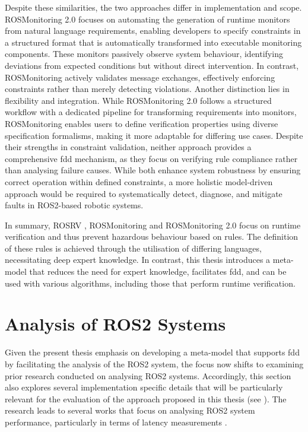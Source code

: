Despite these similarities, the two approaches differ in implementation and scope. ROSMonitoring 2.0 focuses on automating the generation of runtime monitors from natural language requirements, enabling developers to specify constraints in a structured format that is automatically transformed into executable monitoring components. These monitors passively observe system behaviour, identifying deviations from expected conditions but without direct intervention. In contrast, ROSMonitoring actively validates message exchanges, effectively enforcing constraints rather than merely detecting violations.
Another distinction lies in flexibility and integration. While ROSMonitoring 2.0 follows a structured workflow with a dedicated pipeline for transforming requirements into monitors, ROSMonitoring enables users to define verification properties using diverse specification formalisms, making it more adaptable for differing use cases.
Despite their strengths in constraint validation, neither approach provides a comprehensive \acl{fdd} mechanism, as they focus on verifying rule compliance rather than analysing failure causes. While both enhance system robustness by ensuring correct operation within defined constraints, a more holistic model-driven approach would be required to systematically detect, diagnose, and mitigate faults in ROS2-based robotic systems.

In summary, ROSRV \cite{ROSRV}, ROSMonitoring \cite{ROSMonitoring} and ROSMonitoring 2.0 \cite{ROSMonitoring2.0} focus on runtime verification and thus prevent hazardous behaviour based on rules. The definition of these rules is achieved through the utilisation of differing languages, necessitating deep expert knowledge. In contrast, this thesis introduces a meta-model that reduces the need for expert knowledge, facilitates \acl{fdd}, and can be used with various algorithms, including those that perform runtime verification.


\section{Analysis of ROS2 Systems} \label{sec:analyzingROS2}
Given the present thesis emphasis on developing a meta-model that supports \acl{fdd} by facilitating the analysis of the ROS2 system, the focus now shifts to examining prior research conducted on analysing ROS2 systems. Accordingly, this section also explores several implementation specific details that will be particularly relevant for the evaluation of the approach proposed in this thesis (see ).
The research leads to several works that focus on analysing ROS2 system performance, particularly in terms of latency measurements \cite{howFastIsMySoftware}\cite{ROS2exploringPerformance}\cite{multiExecutor}\cite{endToendLatency}.

